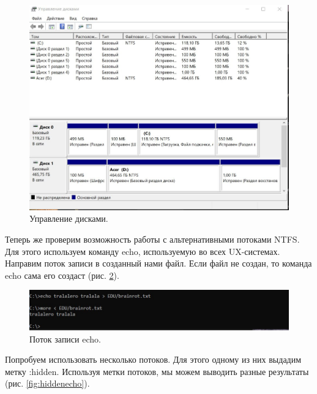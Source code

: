 \begin{figure}
    \centering
    \includegraphics[width=0.5\linewidth]{Pic/lab2/photo_2025-05-21_21-19-25.jpg}
    \caption{Управление дисками.}
    \label{fig:DiskManager}
\end{figure}

Теперь же проверим возможность работы с альтернативными потоками NTFS. Для этого используем команду echo, используемую во всех UX-системах. Направим поток записи в созданный нами файл. Если файл не создан, то команда echo сама его создаст (рис. \ref{fig:echo}). 

\begin{figure}[h!]
    \centering
    \includegraphics[width=\linewidth]{Pic/lab2/photo_2025-05-21_21-19-27.jpg}
    \caption{Поток записи echo.}
    \label{fig:echo}
\end{figure}

Попробуем использовать несколько потоков. Для этого одному из них выдадим метку :hidden. Используя метки потоков, мы можем выводить разные результаты (рис. \ref{fig:hiddenecho}). 


